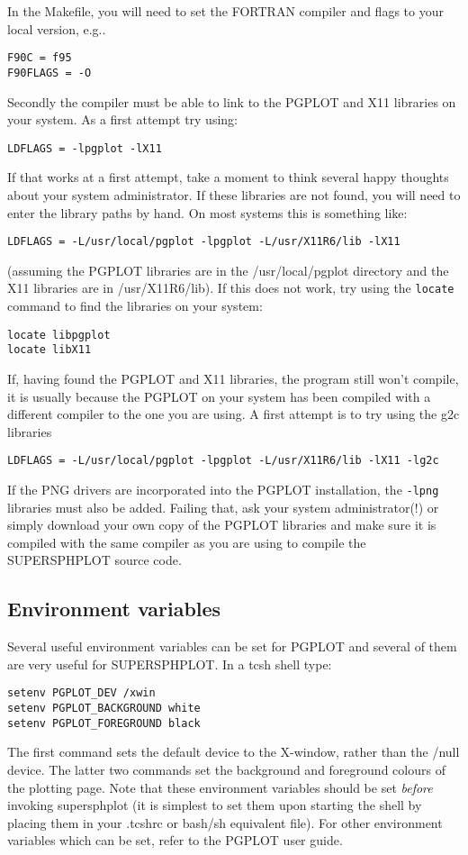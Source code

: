 \documentclass[a4paper,12pt]{article}
\begin{document}
 In the Makefile, you will need to set the FORTRAN compiler and flags to your local version, e.g..
\begin{verbatim}
F90C = f95
F90FLAGS = -O
\end{verbatim}
 Secondly the compiler must be able to link to the PGPLOT and X11 libraries on
your system. As a first attempt try using:
\begin{verbatim}
LDFLAGS = -lpgplot -lX11
\end{verbatim}
If that works at a first attempt, take a moment to think several happy thoughts about your system
administrator. If these libraries are not found, you will need to enter the
library paths by hand. On most systems this is something like:
\begin{verbatim}
LDFLAGS = -L/usr/local/pgplot -lpgplot -L/usr/X11R6/lib -lX11
\end{verbatim}
(assuming the PGPLOT libraries are in the /usr/local/pgplot directory and the
X11 libraries are in /usr/X11R6/lib). If this does not work, try using the
\verb+locate+ command to find the libraries on your system:
\begin{verbatim}
locate libpgplot
locate libX11
\end{verbatim}
 If, having found the PGPLOT and X11
libraries, the program still won't compile, it is usually
because the PGPLOT on your system has been compiled with a different compiler to
the one you are using. A first attempt is to try using the g2c libraries
\begin{verbatim}
LDFLAGS = -L/usr/local/pgplot -lpgplot -L/usr/X11R6/lib -lX11 -lg2c
\end{verbatim}
If the PNG drivers are incorporated into the PGPLOT installation, the \verb+-lpng+ libraries must also be added.
Failing that, ask your system administrator(!) or simply download your own copy of
the PGPLOT libraries and make sure it is compiled with the same compiler as you
are using to compile the SUPERSPHPLOT source code.

\subsection{Environment variables}
 Several useful environment variables can be set for PGPLOT and several of them
are very useful for SUPERSPHPLOT. In a tcsh shell type:
\begin{verbatim}
setenv PGPLOT_DEV /xwin
setenv PGPLOT_BACKGROUND white
setenv PGPLOT_FOREGROUND black
\end{verbatim}
The first command sets the default device to the X-window, rather than the /null
device. The latter two commands set the background and foreground colours of the
plotting page. Note that these environment variables should be set \emph{before}
invoking supersphplot (it is simplest to set them upon starting the shell by placing
them in your .tcshrc or bash/sh equivalent file). For other environment
variables which can be set, refer to the PGPLOT user guide.
\end{document}
